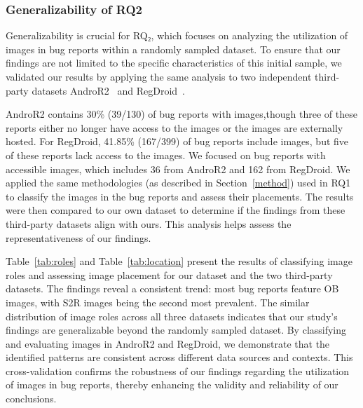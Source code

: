 \subsubsection{Generalizability of RQ2}
\label{represent}
Generalizability is crucial for RQ₂, which focuses on analyzing the utilization of images in bug reports within a randomly sampled dataset. To ensure that our findings are not limited to the specific characteristics of this initial sample, we validated our results by applying the same analysis to two independent third-party datasets 
 AndroR2~\cite{wendland2021andror2, johnson2022empirical} and RegDroid~\cite{xiong2023empirical}.  
 
AndroR2 contains 30\% (39/130) of bug reports with images,though three of these reports either no longer have access to the images or the images are externally hosted. For RegDroid, 41.85\% (167/399) of bug reports include images, but five of these reports lack access to the images. We focused on bug reports with accessible images, which includes 36 from AndroR2 and 162 from RegDroid. We applied the same methodologies (as described in Section~\ref{method}) used in RQ1 to classify the images in the bug reports and assess their placements. The results were then compared to our own dataset to determine if the findings from these third-party datasets align with ours. This analysis helps assess the representativeness of our findings.

%
Table~\ref{tab:roles} and Table~\ref{tab:location} present the results of classifying image roles and assessing image placement for our dataset and the two third-party datasets. The findings reveal a consistent trend: most bug reports feature OB images, with S2R images being the second most prevalent. The similar distribution of image roles across all three datasets indicates that our study's findings are generalizable beyond the randomly sampled dataset. By classifying and evaluating images in AndroR2 and RegDroid, we demonstrate that the identified patterns are consistent across different data sources and contexts. This cross-validation confirms the robustness of our findings regarding the utilization of images in bug reports, thereby enhancing the validity and reliability of our conclusions.





